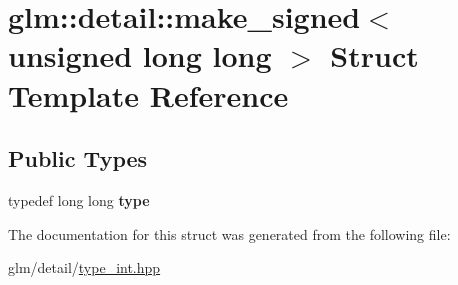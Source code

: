 \hypertarget{structglm_1_1detail_1_1make__signed_3_01unsigned_01long_01long_01_4}{\section{glm\-:\-:detail\-:\-:make\-\_\-signed$<$ unsigned long long $>$ Struct Template Reference}
\label{structglm_1_1detail_1_1make__signed_3_01unsigned_01long_01long_01_4}
}
\subsection*{Public Types}
\begin{DoxyCompactItemize}
\item 
\hypertarget{structglm_1_1detail_1_1make__signed_3_01unsigned_01long_01long_01_4_a025f1f9880bc973147ffb0371771eb0b}{typedef long long {\bfseries type}}\label{structglm_1_1detail_1_1make__signed_3_01unsigned_01long_01long_01_4_a025f1f9880bc973147ffb0371771eb0b}

\end{DoxyCompactItemize}


The documentation for this struct was generated from the following file\-:\begin{DoxyCompactItemize}
\item 
glm/detail/\hyperlink{type__int_8hpp}{type\-\_\-int.\-hpp}\end{DoxyCompactItemize}
